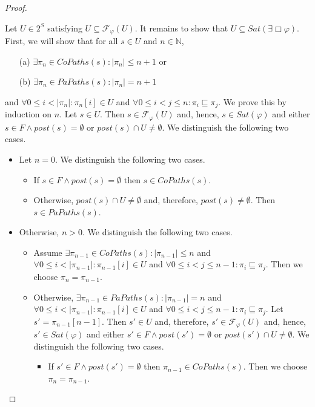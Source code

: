 \documentclass[12pt]{article}
\newcommand{\always}{\Box}
\theoremstyle{definition}
\newenvironment{franck}{\color{red}}{\color{black}}
\begin{document}
\begin{proof}
\begin{itemize}
\begin{franck}
Let $U \in 2^S$ satisfying $U \subseteq \mathcal{F}_{\varphi}(U)$.  It remains to show that $U \subseteq \mathit{Sat}(\exists \always \varphi)$.  First, we will show that for all $s \in U$ and $n \in \mathbb{N}$,
\begin{itemize}
\item[(a)]
$\exists \pi_n \in \mathit{CoPaths}(s) : |\pi_n| \leq n + 1$ or
\item[(b)]
$\exists \pi_n \in \mathit{PaPaths}(s) : |\pi_n| = n + 1$
\end{itemize}
and $\forall 0 \leq i < |\pi_n| : \pi_n[i] \in U$ and $\forall 0 \leq i < j \leq n: \pi_i \sqsubseteq \pi_j$.  We prove this by induction on $n$.  Let $s \in U$.  Then $s \in\mathcal{F}_{\varphi}(U)$ and, hence, $s \in \mathit{Sat}(\varphi)$ and either $s \in F \wedge \mathit{post}(s) = \emptyset$ or $\mathit{post}(s) \cap U \not= \emptyset$.  We distinguish the following two cases.
\begin{itemize}
\item 
Let $n = 0$.  We distinguish the following two cases.
\begin{itemize}
\item 
If $s \in F \wedge \mathit{post}(s) = \emptyset$ then $s \in \mathit{CoPaths}(s)$.
\item
Otherwise, $\mathit{post}(s) \cap U \not= \emptyset$ and, therefore, $\mathit{post}(s) \not= \emptyset$.  Then $s \in \mathit{PaPaths}(s)$.
\end{itemize} 
\item
Otherwise, $n > 0$.  We distinguish the following two cases.
\begin{itemize}
\item 
Assume $\exists \pi_{n-1} \in \mathit{CoPaths}(s) : |\pi_{n-1}| \leq n$ and $\forall 0 \leq i < |\pi_{n-1}| : \pi_{n-1}[i] \in U$ and $\forall 0 \leq i < j \leq n - 1: \pi_i \sqsubseteq \pi_j$.  Then we choose $\pi_n = \pi_{n-1}$.
\item
Otherwise, $\exists \pi_{n-1} \in \mathit{PaPaths}(s) : |\pi_{n-1}| = n$  and $\forall 0 \leq i < |\pi_{n-1}| : \pi_{n-1}[i] \in U$ and $\forall 0 \leq i < j \leq n - 1: \pi_i \sqsubseteq \pi_j$.  Let $s' = \pi_{n-1}[n-1]$.  Then $s' \in U$ and, therefore, $s' \in \mathcal{F}_{\varphi}(U)$ and, hence, $s' \in \mathit{Sat}(\varphi)$ and either $s' \in F \wedge \mathit{post}(s') = \emptyset$ or $\mathit{post}(s') \cap U \not= \emptyset$.  We distinguish the following two cases.
\begin{itemize}
\item 
If $s' \in F \wedge \mathit{post}(s') = \emptyset$ then $\pi_{n-1} \in \mathit{CoPaths}(s)$.  Then we choose $\pi_n = \pi_{n-1}$.

\end{itemize}
\end{itemize}
\end{itemize}
\end{franck}
\end{itemize}
\end{proof}
\end{document}

